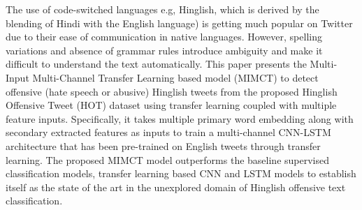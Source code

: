 The use of code-switched languages e.g, Hinglish, which is derived by the blending of Hindi with the English language) is getting much popular on Twitter due to their ease of communication in native languages. However, spelling variations and absence of grammar rules introduce ambiguity and make it difficult to understand the text automatically. This paper presents the Multi-Input Multi-Channel Transfer Learning based model (MIMCT) to detect offensive (hate speech or abusive) Hinglish tweets from the proposed Hinglish Offensive Tweet (HOT) dataset using transfer learning coupled with multiple feature inputs. Specifically, it takes multiple primary word embedding along with secondary extracted features as inputs to train a multi-channel CNN-LSTM architecture that has been pre-trained on English tweets through transfer learning. The proposed MIMCT model outperforms the baseline supervised classification models, transfer learning based CNN and LSTM models to establish itself as the state of the art in the unexplored domain of Hinglish offensive text classification.
